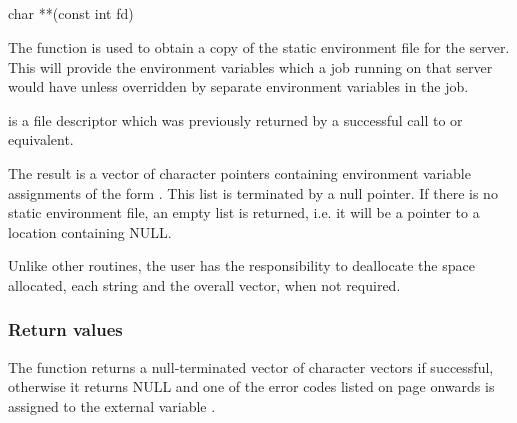 \subsection{\funcnameXBgethenv{}}

\begin{expara}

char **\funcnameXBgethenv{}(const int fd)

\end{expara}

The function \funcXBgethenv{} is used to obtain a copy
of the static environment file for the server. This will provide the
environment variables which a job running on that server would have
unless overridden by separate environment variables in the job.

 is a file descriptor which was previously
returned by a successful call to \funcXBopen{} or equivalent.

The result is a vector of character pointers containing environment
variable assignments of the form .
This list is terminated by a null pointer. If there is no static
environment file, an empty list is returned, i.e. it will be a pointer
to a  location containing NULL.

Unlike other routines, the user has the responsibility to deallocate the
space allocated, each string and the overall vector, when not required.

\subsubsection{Return values}
The function returns a null-terminated vector of character vectors if
successful, otherwise it returns NULL and one of the error codes listed
on page \pageref{errorcodes} onwards is assigned to the external
variable \filename{\errorloc}.

